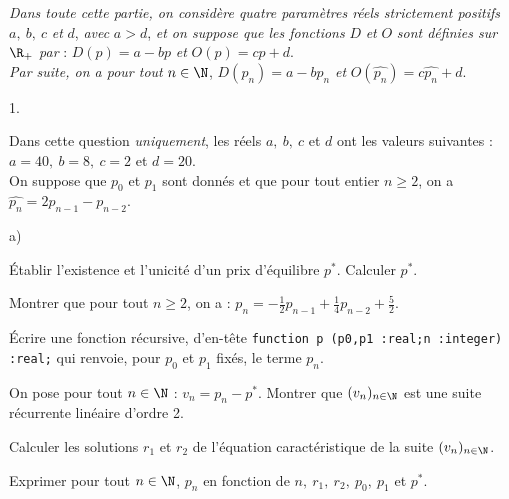 \documentclass[11pt]{article}%
\begin{document}
\textit{Dans toute cette partie, on considère quatre paramètres réels
strictement positifs} $a,\ b, \ c$ \textit{et} $d$, \textit{avec} $a >
d$, \textit{et on suppose que les fonctions} $D$ \textit{et} $O$
\textit{sont définies sur} $\R_+ $ \textit{par} : $D(p) = a - b p$
\textit{et} $O(p) = c p + d$. \\
\textit{Par suite, on a pour tout} $n \in \N$, $D(p_{n}) = a - b p_{n}$
\textit{et} $O(\widehat{p_{n}}) = c \widehat{p_{n}} + d$.

\begin{noliste}{1.}
 \setlength{\itemsep}{4mm}

\item Dans cette question \textit{uniquement}, les réels $a,\ b,\ c$ et
$d$ ont les valeurs suivantes : $a = 40,\ b = 8,\ c = 2$ et $d = 20$.
\\
On suppose que $p_{0}$ et $p_{1}$ sont donnés et que pour tout entier
$n \geq 2$, on a $\widehat{p_{n}} = 2 p_{n-1} - p_{n-2}$.

\begin{noliste}{a)}
 \setlength{\itemsep}{2mm}

\item Établir l'existence et l'unicité d'un prix d'équilibre
$p^{\ast}$. Calculer $p^{\ast}$. \\

\item Montrer que pour tout $n \geq 2$, on a : $p_{n} = - \frac{1}{2}
p_{n-1} + \frac{1}{4} p_{n-2} + \frac{5}{2}$. \\

\item Écrire une fonction \Scilab{} récursive, d'en-tête
\texttt{function p (p0,p1 :real;n :integer) :real;} qui renvoie, pour
$p_{0}$ et $p_{1}$ fixés, le terme $p_{n}$. \\

\item On pose pour tout $n \in \N$ : $v_{n} = p_{n} - p^{\ast}$.
Montrer que $(v_{n})_{n \in \N}$ est une suite récurrente linéaire
d'ordre 2. \\

\item Calculer les solutions $r_{1}$ et $r_{2}$ de l'équation
caractéristique de la suite $(v_{n})_{n \in \N}$. \\

\item Exprimer pour tout $n \in \N$, $p_{n}$ en fonction de $n,\
r_{1},\ r_{2},\ p_{0},\ p_{1}$ et $p^{\ast}$. \\


\end{noliste}
\end{noliste}
\end{document}
